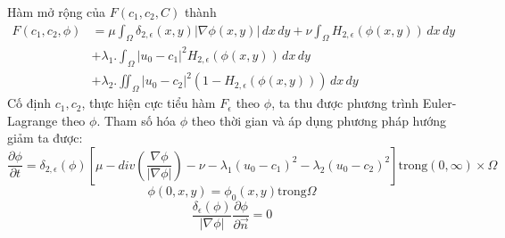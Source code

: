 \documentclass[14pt,oneside,a4paper]{extreport}
\begin{document}
 Hàm mở rộng của $F(c_1,c_2,C)$ thành
\begin{equation*}
\begin{split}
F(c_1, c_2, \phi)&=\mu \int_{\Omega}\delta_{2,\epsilon}(x,y)|\nabla \phi(x,y)|\,dx\,dy+\nu  \int_{\Omega}H_{2,\epsilon}( \phi(x,y))\,dx\,dy \\ 
&+\lambda_1 .\int_{\Omega} |u_0-c_1|^2H_{2,\epsilon}(\phi(x,y)) \,dx\,dy\\&+\lambda_2 .\iint_{\Omega} |u_0-c_2|^2(1-H_{2,\epsilon}(\phi(x,y))) \,dx\,dy
\end{split}
\end{equation*}
Cố định $c_1, c_2$, thực hiện cực tiểu hàm $F_{\epsilon}$ theo $\phi$, ta thu được phương trình Euler-Lagrange theo $\phi$. Tham số hóa $\phi$ theo thời gian và áp dụng phương pháp hướng giảm ta được:
\begin{equation}
\dfrac{\partial \phi}{\partial t}= \delta_{2,\epsilon}(\phi)[\mu- div(\dfrac{\nabla \phi}{|\nabla \phi|})- \nu- \lambda_1 (u_0-c_1)^2-\lambda_2 (u_0-c_2)^2]  \text{trong} (0,\infty)\times \Omega
\end{equation}
\begin{equation}
\phi(0,x,y)=\phi_0(x,y) \text{trong} \Omega 
\end{equation}
\begin{equation}
\dfrac{\delta_{\epsilon}(\phi)}{|\nabla \phi|}\dfrac{\partial \phi}{\partial \vec{n}}=0
\end{equation}
\end{document}

